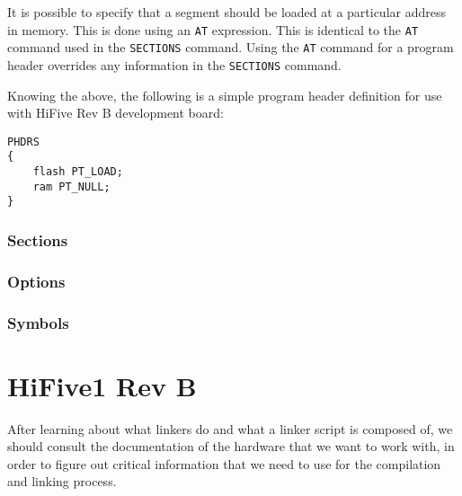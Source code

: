 \documentclass[a4paper,12pt,twoside]{report}
\begin{document}
                It is possible to specify that a segment should be loaded at a particular address in memory. This is done using an \lstinline|AT| expression. This is identical to the \lstinline|AT| command used in the \lstinline|SECTIONS| command. Using the \lstinline|AT| command for a program header overrides any information in the \lstinline|SECTIONS| command.\cite{gnuldProgramHeaders}

                Knowing the above, the following is a simple program header definition for use with HiFive Rev B development board:
\begin{lstlisting}
PHDRS
{
    flash PT_LOAD;
    ram PT_NULL;
}
\end{lstlisting}

            \subsection{Sections}

            \subsection{Options}

            \subsection{Symbols}

        \chapter{HiFive1 Rev B}
            After learning about what linkers do and what a linker script is composed of, we should consult the documentation of the hardware that we want to work with, in order to figure out critical information that we need to use for the compilation and linking process.
\end{document}
